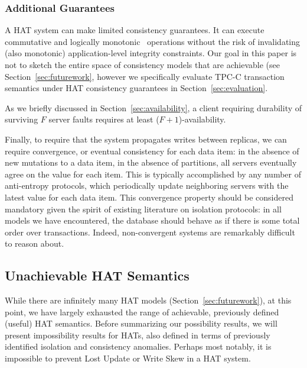 \subsubsection{Additional Guarantees}

 A HAT system can make limited
consistency guarantees. It can execute commutative and logically
monotonic~\cite{calm} operations without the risk of invalidating
(also monotonic) application-level integrity constraints. Our goal in
this paper is not to sketch the entire space of consistency models
that are achievable (see Section~\ref{sec:futurework}, however we
specifically evaluate TPC-C transaction semantics under HAT
consistency guarantees in Section~\ref{sec:evaluation}.

\vspace{.5em} As we briefly discussed in
Section~\ref{sec:availability}, a client requiring durability
of surviving $F$ server faults requires at least ($F+1$)-availability.

\vspace{.5em} Finally, to
require that the system propagates writes between replicas, we can
require convergence, or eventual consistency for each data item: in
the absence of new mutations to a data item, in the absence of
partitions, all servers eventually agree on the value for each
item. This is typically accomplished by any number of anti-entropy
protocols, which periodically update neighboring servers with the
latest value for each data item. This convergence property should be
considered mandatory given the spirit of existing literature on
isolation protocols: in all models we have encountered, the database
should behave as if there is some total order over
transactions. Indeed, non-convergent systems are remarkably difficult
to reason about.

\subsection{Unachievable HAT Semantics}
\label{sec:unachievable-hat}

While there are infinitely many HAT models
(Section~\ref{sec:futurework}), at this point, we have largely
exhausted the range of achievable, previously defined (useful) HAT
semantics. Before summarizing our possibility results, we will present
impossibility results for HATs, also defined in terms of previously
identified isolation and consistency anomalies. Perhaps most notably,
it is impossible to prevent Lost Update or Write Skew in a HAT system.

